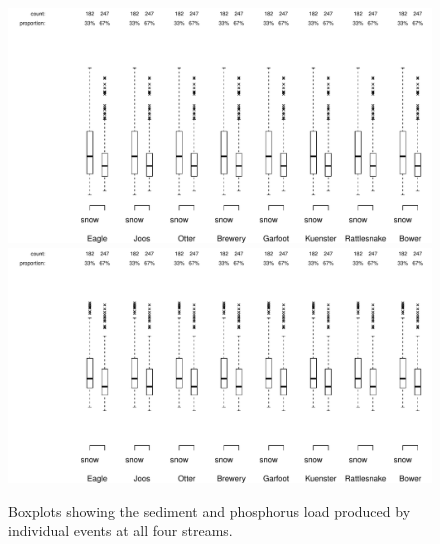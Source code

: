\documentclass[10pt]{article}
\begin{document}
\begin{figure}[h]
    \begin{center}
\includegraphics{loadings-boxplot_stot}
    \vspace{15mm}
\includegraphics{loadings-boxplot_ptot}
    \caption{Boxplots showing the sediment and phosphorus load produced by individual events at all four streams.\label{boxplots}}
    \end{center}
\end{figure}












    
    
\end{document}
